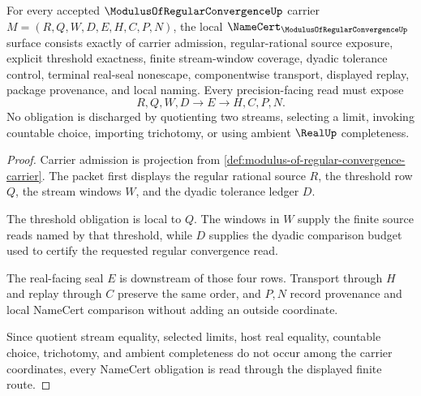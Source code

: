 \begin{theorem}
\label{thm:modulus-of-regular-convergence-namecert-obligations}
For every accepted $\ModulusOfRegularConvergenceUp$ carrier $M=(R,Q,W,D,E,H,C,P,N)$, the local $\NameCert_{\ModulusOfRegularConvergenceUp}$ surface consists exactly of carrier admission, regular-rational source exposure, explicit threshold exactness, finite stream-window coverage, dyadic tolerance control, terminal real-seal nonescape, componentwise transport, displayed replay, package provenance, and local naming. Every precision-facing read must expose
$$
R,Q,W,D \longrightarrow E \longrightarrow H,C,P,N .
$$
No obligation is discharged by quotienting two streams, selecting a limit, invoking countable choice, importing trichotomy, or using ambient $\RealUp$ completeness.
\end{theorem}
\begin{proof}
Carrier admission is projection from \autoref{def:modulus-of-regular-convergence-carrier}. The packet first displays the regular rational source $R$, the threshold row $Q$, the stream windows $W$, and the dyadic tolerance ledger $D$.

The threshold obligation is local to $Q$. The windows in $W$ supply the finite source reads named by that threshold, while $D$ supplies the dyadic comparison budget used to certify the requested regular convergence read.

The real-facing seal $E$ is downstream of those four rows. Transport through $H$ and replay through $C$ preserve the same order, and $P,N$ record provenance and local NameCert comparison without adding an outside coordinate.

Since quotient stream equality, selected limits, host real equality, countable choice, trichotomy, and ambient completeness do not occur among the carrier coordinates, every NameCert obligation is read through the displayed finite route.
\end{proof}

